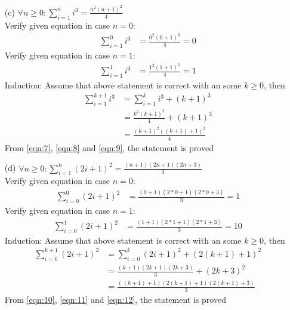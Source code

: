 \begin{enumerate}
    \newpage
    \item[(c)] $\forall n\geq 0: \displaystyle\sum^{n}_{i=1} i^3 = \frac{n^2(n+1)^2}{4}$ \\
        Verify given equation in case $n=0$:
            \begin{align}
                \displaystyle\sum^{0}_{i=1} i^3 &= \frac{0^2(0+1)^2}{4} = 0 \label{eqn:7}
            \end{align}
        Verify given equation in case $n=1$:
            \begin{align}
                \displaystyle\sum^{1}_{i=1} i^3 &= \frac{1^2(1+1)^2}{4} = 1 \label{eqn:8}
            \end{align}
        Induction: Assume that above statement is correct with an some $k \geq 0$, then\\
        \begin{align}
            \displaystyle\sum^{k+1}_{i=1} i^3 &= \displaystyle\sum^{k}_{i=1} i^3 + (k+1)^3 \\
                                            &= \frac{k^2(k+1)^2}{4} + (k+1)^3 \\
                                            &= \frac{(k+1)^2((k+1)+1)^2}{4} \label{eqn:9}
        \end{align}
        From \ref{eqn:7}, \ref{eqn:8} and \ref{eqn:9}, the statement is proved
    
    \item[(d)] $\forall n\geq 0: \displaystyle\sum^{n}_{i=1} (2i+1)^2 = \frac{(n+1)(2n+1)(2n+3)}{3}$ \\
        Verify given equation in case $n=0$:
            \begin{align}
                \displaystyle\sum^{0}_{i=0} (2i+1)^2 &= \frac{(0+1)(2*0+1)(2*0+3)}{3} = 1 \label{eqn:10}
            \end{align}
        Verify given equation in case $n=1$:
            \begin{align}
                \displaystyle\sum^{1}_{i=0} (2i+1)^2 &= \frac{(1+1)(2*1+1)(2*1+3)}{3} = 10 \label{eqn:11}
            \end{align}
        Induction: Assume that above statement is correct with an some $k \geq 0$, then\\
        \begin{align}
            \displaystyle\sum^{k+1}_{i=0} (2i+1)^2 &= \displaystyle\sum^{k}_{i=0} (2i+1)^2 + (2(k+1)+1)^2 \\
                                            &= \frac{(k+1)(2k+1)(2k+3)}{3} + (2k+3)^2 \\
                                            &= \frac{((k+1)+1)(2(k+1)+1)(2(k+1)+3)}{3} \label{eqn:12}
        \end{align}
        From \ref{eqn:10}, \ref{eqn:11} and \ref{eqn:12}, the statement is proved


\end{enumerate}
